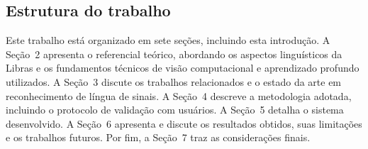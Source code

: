 \subsection{Estrutura do trabalho}

Este trabalho está organizado em sete seções, incluindo esta introdução. A
Seção~2 apresenta o referencial teórico, abordando os aspectos linguísticos da
Libras e os fundamentos técnicos de visão computacional e aprendizado profundo
utilizados. A Seção~3 discute os trabalhos relacionados e o estado da arte em
reconhecimento de língua de sinais. A Seção~4 descreve a metodologia adotada,
incluindo o protocolo de validação com usuários. A Seção~5 detalha o sistema
desenvolvido. A Seção~6 apresenta e discute os resultados obtidos, suas
limitações e os trabalhos futuros. Por fim, a Seção~7 traz as considerações
finais.
